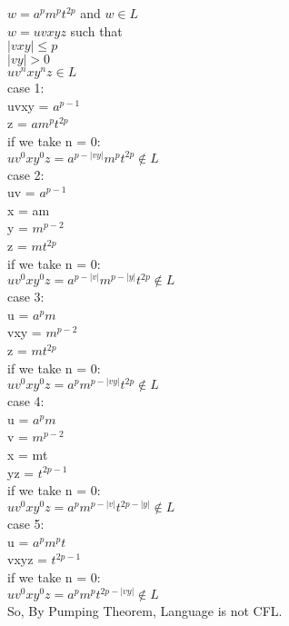 \documentclass[a4paper,12pt]{article}
\begin{document}
\begin{tcolorbox}
$w = a^p m^p t^{2p}$ and $ w \in L$ \\
$w = uvxyz$ such that \\
$|vxy|\leq p$ \\
$|vy| > 0$ \\
$u v^n x y^n z \in L$ \\

case 1: \\

uvxy = $a^{p-1} $ \\
z = $a m^p t^{2p}$\\
if we take n = 0: \\
$u v^0 x y^0 z = a^{p - |vy|} m^p t^{2p} \notin L$\\

case 2:\\

uv = $a^{p-1}$ \\
x = am \\
y = $m^{p-2}$ \\
z = $m t^{2p}$ \\
if we take n = 0: \\
$u v^0 x y^0 z = a^{p - |v|} m^{p-|y|} t^{2p} \notin L$\\

case 3:\\

u = $a^p m$ \\
vxy = $m^{p-2}$ \\
z = $m t^{2p}$ \\
if we take n = 0: \\
$u v^0 x y^0 z = a^p  m^{p-|vy|} t^{2p} \notin L$\\

case 4: \\

u = $a^p m$ \\
v = $m^{p-2}$ \\
x = mt \\
yz = $t^{2p-1}$ \\
if we take n = 0: \\
$u v^0 x y^0 z = a^p  m^{p-|v|} t^{2p-|y|} \notin L$\\

case 5: \\
u = $a^p m^p t$ \\
vxyz = $t^{2p-1}$\\
if we take n = 0: \\
$u v^0 x y^0 z = a^p  m^{p} t^{2p-|vy|} \notin L$\\


So, By Pumping Theorem, Language is not CFL. \\


\end{tcolorbox}
\end{document}
